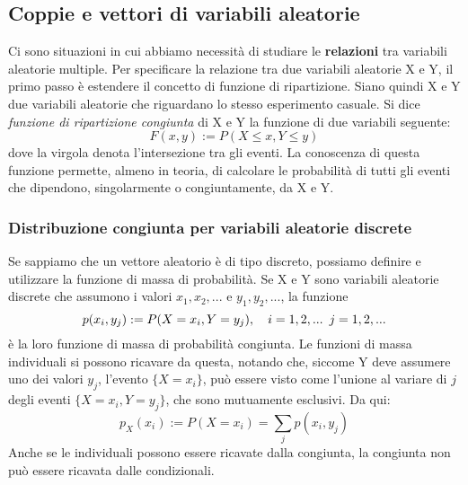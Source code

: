 \documentclass[11pt]{article}
\begin{document}
\subsection{Coppie e vettori di variabili aleatorie}
Ci sono situazioni in cui abbiamo necessità di studiare le \textbf{relazioni} tra variabili aleatorie multiple. Per specificare la relazione tra due variabili aleatorie X e Y, il primo passo è estendere il concetto di funzione di ripartizione.
Siano quindi X e Y due variabili aleatorie che riguardano lo stesso esperimento casuale. Si dice \textit{funzione di ripartizione congiunta} di X e Y la funzione di due variabili seguente:
\begin{displaymath}
    F(x,y) := P(X\le x, Y \le y)
\end{displaymath}
dove la virgola denota l'intersezione tra gli eventi.
La conoscenza di questa funzione permette, almeno in teoria, di calcolare le probabilità di tutti gli eventi che dipendono, singolarmente o congiuntamente, da X e Y. 
\subsubsection{Distribuzione congiunta per variabili aleatorie discrete}
Se sappiamo che un vettore aleatorio è di tipo discreto, possiamo definire e utilizzare la funzione di massa di probabilità.
Se X e Y sono variabili aleatorie discrete che assumono i valori $x_1, x_2,...$ e $y_1,y_2,...$, la funzione
\begin{displaymath}
    p(x_i, y_j) := P(X=x_i, Y=y_j),\hspace{10px}i=1,2,...\hspace{5px}j=1,2,...
\end{displaymath}
è la loro funzione di massa di probabilità congiunta.
Le funzioni di massa individuali si possono ricavare da questa, notando che, siccome Y deve assumere uno dei valori $y_j$, l'evento $\{X=x_i\}$, può essere visto come l'unione al variare di $j$ degli eventi $\{X=x_i, Y=y_j\}$, che sono mutuamente esclusivi. Da qui:
\begin{displaymath}
    p_X(x_i) := P(X=x_i) = \sum_j p(x_i, y_j)
\end{displaymath}
Anche se le individuali possono essere ricavate dalla congiunta, la congiunta non può essere ricavata dalle condizionali. 
\end{document}
